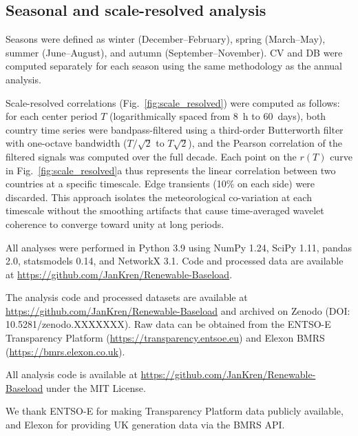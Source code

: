 \documentclass[sn-nature]{sn-jnl}%
\begin{document}
\subsection{Seasonal and scale-resolved analysis}

Seasons were defined as winter (December--February), spring (March--May), summer (June--August), and autumn (September--November). CV and DB were computed separately for each season using the same methodology as the annual analysis.

Scale-resolved correlations (Fig.~\ref{fig:scale_resolved}) were computed as follows: for each center period $T$ (logarithmically spaced from 8~h to 60~days), both country time series were bandpass-filtered using a third-order Butterworth filter with one-octave bandwidth ($T/\sqrt{2}$ to $T\sqrt{2}$), and the Pearson correlation of the filtered signals was computed over the full decade. Each point on the $r(T)$ curve in Fig.~\ref{fig:scale_resolved}a thus represents the linear correlation between two countries at a specific timescale. Edge transients (10\% on each side) were discarded. This approach isolates the meteorological co-variation at each timescale without the smoothing artifacts that cause time-averaged wavelet coherence to converge toward unity at long periods.

All analyses were performed in Python 3.9 using NumPy 1.24, SciPy 1.11, pandas 2.0, statsmodels 0.14, and NetworkX 3.1. Code and processed data are available at \url{https://github.com/JanKren/Renewable-Baseload}.


\backmatter


The analysis code and processed datasets are available at \url{https://github.com/JanKren/Renewable-Baseload} and archived on Zenodo (DOI: 10.5281/zenodo.XXXXXXX).%
Raw data can be obtained from the ENTSO-E Transparency Platform (\url{https://transparency.entsoe.eu}) and Elexon BMRS (\url{https://bmrs.elexon.co.uk}).


All analysis code is available at \url{https://github.com/JanKren/Renewable-Baseload} under the MIT License.


We thank ENTSO-E for making Transparency Platform data publicly available, and Elexon for providing UK generation data via the BMRS API.
\end{document}
